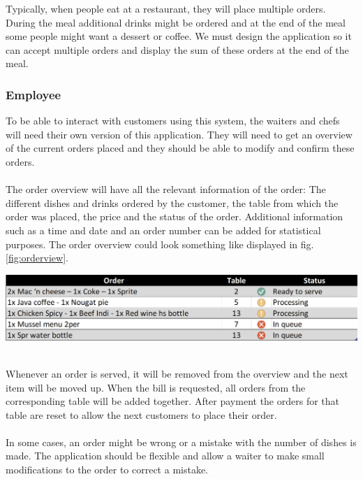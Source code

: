 \documentclass[12pt]{article}
\newenvironment{Figure}
	{\par\medskip\noindent\minipage{\linewidth}}
	{\endminipage\par\medskip}
\begin{document}
\begin{multicols}{2}
\noindent
Typically, when people eat at a restaurant, they will place multiple orders. During the meal additional drinks might be ordered and at the end of the meal some people might want a dessert or coffee. We must design the application so it can accept multiple orders and display the sum of these orders at the end of the meal.


\subsubsection{Employee}
To be able to interact with customers using this system, the waiters and chefs will need their own version of this application. They will need to get an overview of the current orders placed and they should be able to modify and confirm these orders.
\\\\
The order overview will have all the relevant information of the order: The different dishes and drinks ordered by the customer, the table from which the order was placed, the price and the status of the order. Additional information such as a time and date and an order number can be added for statistical purposes.
The order overview could look something like displayed in fig. \ref{fig:orderview}.
\begin{Figure}
	\includegraphics[width=\linewidth]{illustrations/orderview.PNG}
	\label{fig:orderview}
\end{Figure}
\noindent \\Whenever an order is served, it will be removed from the overview and the next item will be moved up. When the bill is requested, all orders from the corresponding table will be added together. After payment the orders for that table are reset to allow the next customers to place their order.
\\\\
In some cases, an order might be wrong or a mistake with the number of dishes is made. The application should be flexible and allow a waiter to make small modifications to the order to correct a mistake.

\end{multicols}
\end{document}
